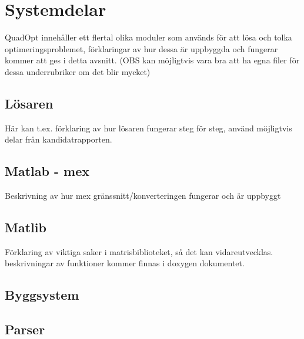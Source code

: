 \section{Systemdelar}
QuadOpt innehåller ett flertal olika moduler som används för att lösa och tolka optimeringsproblemet, förklaringar av hur dessa är uppbyggda och fungerar kommer att ges i detta avsnitt.
(OBS kan möjligtvis vara bra att ha egna filer för dessa underrubriker om det blir mycket)

\subsection{Lösaren}
Här kan t.ex. förklaring av hur lösaren fungerar steg för steg, använd möjligtvis delar från kandidatrapporten.

\subsection{Matlab - mex} \label{subsec:mex}
Beskrivning av hur mex gränssnitt/konverteringen fungerar och är uppbyggt
\subsection{Matlib}
Förklaring av viktiga saker i matrisbiblioteket, så det kan vidareutvecklas. beskrivningar av funktioner kommer finnas i doxygen dokumentet.
\subsection{Byggsystem}

\subsection{Parser}
